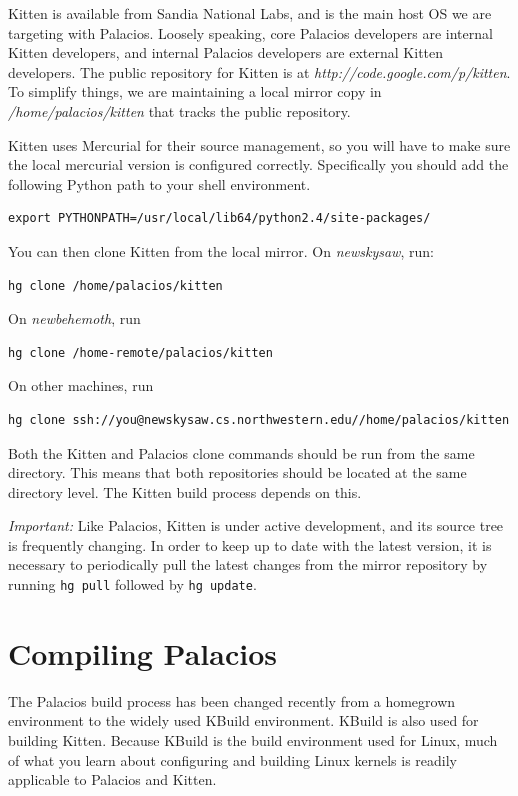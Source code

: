 \documentclass[11pt]{article}
\begin{document}
Kitten is available from Sandia National Labs, and is the main host OS
we are targeting with Palacios. Loosely speaking, core Palacios
developers are internal Kitten developers, and internal Palacios
developers are external Kitten developers. The public repository for
Kitten is at {\em http://code.google.com/p/kitten}.  To simplify things,
we are maintaining a local mirror copy in {\em /home/palacios/kitten}
that tracks the public repository.

Kitten uses Mercurial for their source management, so you will have to
make sure the local mercurial version is configured correctly.
Specifically you should add the following Python path to your shell environment.

\begin{verbatim}
export PYTHONPATH=/usr/local/lib64/python2.4/site-packages/
\end{verbatim}

You can then clone Kitten from the local mirror.   On {\em newskysaw},
run: 
\begin{verbatim}
hg clone /home/palacios/kitten
\end{verbatim}
On {\em newbehemoth}, run
\begin{verbatim}
hg clone /home-remote/palacios/kitten
\end{verbatim}
On other machines, run
\begin{verbatim}
hg clone ssh://you@newskysaw.cs.northwestern.edu//home/palacios/kitten
\end{verbatim}


Both the Kitten and Palacios clone commands should be run from the
same directory. This means that both repositories should be located at
the same directory level. The Kitten build process depends on this.

{\em Important:} Like Palacios, Kitten is under active development,
and its source tree is frequently changing. In order to keep up to
date with the latest version, it is necessary to periodically pull the
latest changes from the mirror repository by running \verb.hg pull.
followed by \verb.hg update..

\section{Compiling Palacios}

The Palacios build process has been changed recently from a homegrown
environment to the widely used KBuild environment.  KBuild is also
used for building Kitten.  Because KBuild is the build environment
used for Linux, much of what you learn about configuring and building
Linux kernels is readily applicable to Palacios and Kitten. 
\end{document}
